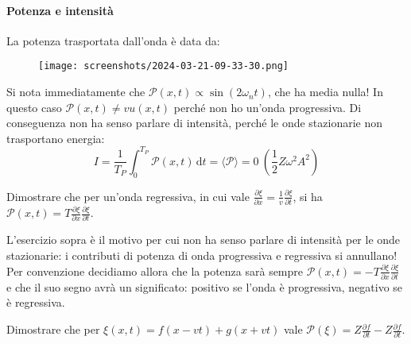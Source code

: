 \paragraph{Potenza e intensità}
La potenza trasportata dall'onda è data da:
\begin{figure}[H]
	\centering
	\texttt{[image: screenshots/2024-03-21-09-33-30.png]}
\end{figure}
Si nota immediatamente che \(\mathcal{P} (x,t) \propto \sin (2 \omega _n t)\), che ha media nulla! In questo caso \(\mathcal{P} (x,t) \neq v u(x,t)\) perché non ho un'onda progressiva. Di conseguenza non ha senso parlare di intensità, perché le onde stazionarie non trasportano energia:
\[
	I=\frac{1}{T_P}\int_{0}^{T_P} \mathcal{P} (x,t) \,\mathrm{d}t = \langle \mathcal{P} \rangle =0 \ \left( \frac{1}{2}Z \omega ^{2} A ^{2} \right)
\]
\begin{exercise}
	Dimostrare che per un'onda regressiva, in cui vale \(\frac{\partial \xi }{\partial x} = \frac{1}{v} \frac{\partial \xi }{\partial t}  \), si ha \(\mathcal{P} (x,t) = T \frac{\partial \xi }{\partial x} \frac{\partial \xi }{\partial t} \).
\end{exercise}
L'esercizio sopra è il motivo per cui non ha senso parlare di intensità per le onde stazionarie: i contributi di potenza di onda progressiva e regressiva si annullano! Per convenzione decidiamo allora che la potenza sarà sempre \(\mathcal{P} (x,t) = -T \frac{\partial \xi }{\partial x} \frac{\partial \xi }{\partial t}  \) e che il suo segno avrà un significato: positivo se l'onda è progressiva, negativo se è regressiva.
\begin{exercise}
	Dimostrare che per \(\xi (x,t) = f(x-vt) + g(x+vt)\) vale \(\mathcal{P} (\xi )= Z \frac{\partial f}{\partial t} - Z \frac{\partial f}{\partial t}\).
\end{exercise}

